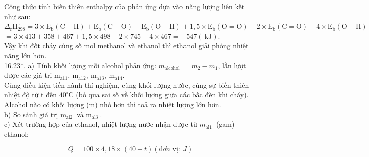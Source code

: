 \documentclass[10pt]{article}
\begin{document}
Công thức tính biến thiên enthalpy của phản ứng dựa vào năng lượng liên kết như sau:\\
$\Delta_{\mathrm{r}} \mathrm{H}_{298}^{\circ}=3 \times \mathrm{E}_{\mathrm{b}}(\mathrm{C}-\mathrm{H})+\mathrm{E}_{\mathrm{b}}(\mathrm{C}-\mathrm{O})+\mathrm{E}_{\mathrm{b}}(\mathrm{O}-\mathrm{H})+1,5 \times \mathrm{E}_{\mathrm{b}}(\mathrm{O}=\mathrm{O})-2 \times \mathrm{E}_{\mathrm{b}}(\mathrm{C}=\mathrm{O})- 4 \times \mathrm{E}_{\mathrm{b}}(\mathrm{O}-\mathrm{H})$\\
$=3 \times 413+358+467+1,5 \times 498-2 \times 745-4 \times 467=-547(\mathrm{~kJ})$.\\
Vậy khi đốt cháy cùng số mol methanol và ethanol thì ethanol giải phóng nhiệt năng lớn hơn.\\
16.23*. a) Tính khối lượng mỗi alcohol phản ứng: $m_{\text {alcohol }}=m_{2}-m_{1}$, lần lượt được các giá trị $\mathrm{m}_{\mathrm{a} 11}, \mathrm{~m}_{\mathrm{a} 12}, \mathrm{~m}_{\mathrm{a} 13}, \mathrm{~m}_{\mathrm{a} 14}$.\\
Cùng điều kiện tiến hành thí nghiệm, cùng khối lượng nước, cùng sự biến thiên nhiệt độ từ t đến $40^{\circ} \mathrm{C}$ (bỏ qua sai số về khối lượng giữa các bấc đèn khi cháy). Alcohol nào có khối lượng (m) nhỏ hơn thì toả ra nhiệt lượng lớn hơn.\\
b) So sánh giá trị $\mathrm{m}_{\text {al2 }}$ và $\mathrm{m}_{\text {al3 }}$.\\
c) Xét trường hợp của ethanol, nhiệt lượng nước nhận được từ $m_{\text {al1 }}$ (gam) ethanol:

$$
Q=100 \times 4,18 \times(40-t)(đ o ̛ n \text { vị: } J)
$$
\end{document}
